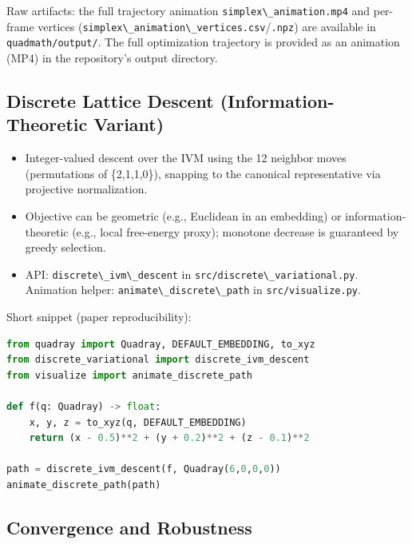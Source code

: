 \documentclass[
  10pt,
]{article}
\newcommand{\passthrough}[1]{#1}
\providecommand{\tightlist}{%
  \setlength{\itemsep}{0pt}\setlength{\parskip}{0pt}}
\begin{document}
Raw artifacts: the full trajectory animation
\passthrough{\lstinline!simplex\_animation.mp4!} and per-frame vertices
(\passthrough{\lstinline!simplex\_animation\_vertices.csv!}/\passthrough{\lstinline!.npz!})
are available in \passthrough{\lstinline!quadmath/output/!}. The full
optimization trajectory is provided as an animation (MP4) in the
repository's output directory.

\hypertarget{discrete-lattice-descent-information-theoretic-variant}{%
\subsection{Discrete Lattice Descent (Information-Theoretic
Variant)}\label{discrete-lattice-descent-information-theoretic-variant}}

\begin{itemize}
\tightlist
\item
  Integer-valued descent over the IVM using the 12 neighbor moves
  (permutations of \{2,1,1,0\}), snapping to the canonical
  representative via projective normalization.
\item
  Objective can be geometric (e.g., Euclidean in an embedding) or
  information-theoretic (e.g., local free-energy proxy); monotone
  decrease is guaranteed by greedy selection.
\item
  API: \passthrough{\lstinline!discrete\_ivm\_descent!} in
  \passthrough{\lstinline!src/discrete\_variational.py!}. Animation
  helper: \passthrough{\lstinline!animate\_discrete\_path!} in
  \passthrough{\lstinline!src/visualize.py!}.
\end{itemize}

Short snippet (paper reproducibility):

\begin{lstlisting}[language=Python]
from quadray import Quadray, DEFAULT_EMBEDDING, to_xyz
from discrete_variational import discrete_ivm_descent
from visualize import animate_discrete_path

def f(q: Quadray) -> float:
    x, y, z = to_xyz(q, DEFAULT_EMBEDDING)
    return (x - 0.5)**2 + (y + 0.2)**2 + (z - 0.1)**2

path = discrete_ivm_descent(f, Quadray(6,0,0,0))
animate_discrete_path(path)
\end{lstlisting}

\hypertarget{convergence-and-robustness}{%
\subsection{Convergence and
Robustness}\label{convergence-and-robustness}}
\end{document}
